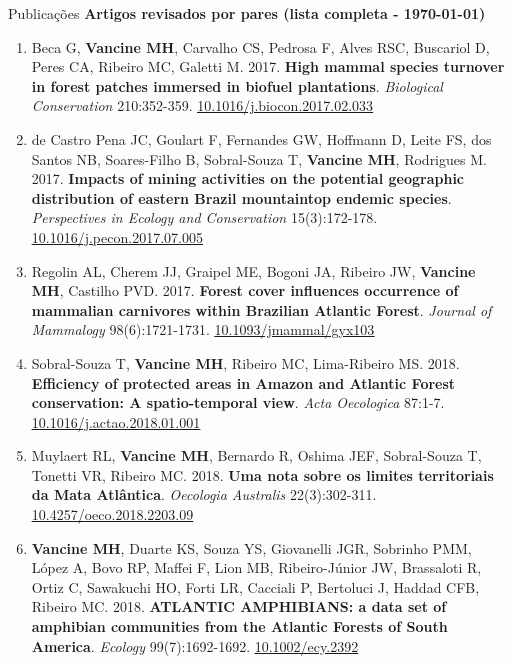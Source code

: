 \documentclass{resume}
\begin{document}
\begin{rSection}{Publicações}
{\bf Artigos revisados por pares (lista completa - \today)}

\begin{enumerate} 
\item Beca G, {\bf Vancine MH}, Carvalho CS, Pedrosa F, Alves RSC, Buscariol D, Peres CA, Ribeiro MC, Galetti M. 2017. {\bf High mammal species turnover in forest patches immersed in biofuel plantations}. {\it Biological Conservation} 210:352-359. \href{https://doi.org/10.1016/j.biocon.2017.02.033}{\underline{10.1016/j.biocon.2017.02.033}}

\item de Castro Pena JC, Goulart F, Fernandes GW, Hoffmann D, Leite FS, dos Santos NB, Soares-Filho B, Sobral-Souza T, {\bf Vancine MH}, Rodrigues M. 2017. {\bf Impacts of mining activities on the potential geographic distribution of eastern Brazil mountaintop endemic species}. {\it Perspectives in Ecology and Conservation} 15(3):172-178. \href{https://doi.org/10.1016/j.pecon.2017.07.005}{\underline{10.1016/j.pecon.2017.07.005}}

\item Regolin AL, Cherem JJ, Graipel ME, Bogoni JA, Ribeiro JW, {\bf Vancine MH}, Castilho PVD. 2017. {\bf Forest cover influences occurrence of mammalian carnivores within Brazilian Atlantic Forest}. {\it Journal of Mammalogy} 98(6):1721-1731. \href{https://doi.org/10.1093/jmammal/gyx103}{\underline{10.1093/jmammal/gyx103}}

\item Sobral-Souza T, {\bf Vancine MH}, Ribeiro MC, Lima-Ribeiro MS. 2018. {\bf Efficiency of protected areas in Amazon and Atlantic Forest conservation: A spatio-temporal view}. {\it Acta Oecologica} 87:1-7. \href{https://doi.org/10.1016/j.actao.2018.01.001}{\underline{10.1016/j.actao.2018.01.001}}

\item Muylaert RL, {\bf Vancine MH}, Bernardo R, Oshima JEF, Sobral-Souza T, Tonetti VR, Ribeiro MC. 2018. {\bf Uma nota sobre os limites territoriais da Mata Atlântica}. {\it Oecologia Australis} 22(3):302-311. \href{https://doi.org/10.4257/oeco.2018.2203.09}{\underline{10.4257/oeco.2018.2203.09}}

\item {\bf Vancine MH}, Duarte KS, Souza YS, Giovanelli JGR, Sobrinho PMM, López A, Bovo RP, Maffei F, Lion MB, Ribeiro-Júnior JW, Brassaloti R, Ortiz C, Sawakuchi HO, Forti LR, Cacciali P, Bertoluci J, Haddad CFB, Ribeiro MC. 2018. {\bf ATLANTIC AMPHIBIANS: a data set of amphibian communities from the Atlantic Forests of South America}. {\it Ecology} 99(7):1692-1692. \href{https://doi.org/10.1002/ecy.2392}{\underline{10.1002/ecy.2392}}


\end{enumerate}
\end{rSection}
\end{document}

